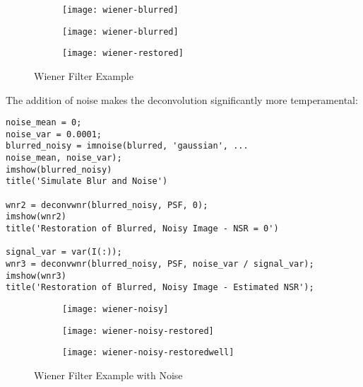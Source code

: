 \begin{figure}[ht]
	\centering
	\begin{subfigure}[b]{0.3\textwidth}
		\centering
		\texttt{[image: wiener-blurred]}
		\caption{}
		\label{fig:wiener-original}
	\end{subfigure}\hfill
	\begin{subfigure}[b]{0.3\textwidth}
		\centering
		\texttt{[image: wiener-blurred]}
		\caption{}
		\label{fig:wiener-blurred}
	\end{subfigure}\hfill
	\begin{subfigure}[b]{0.3\textwidth}
		\centering
		\texttt{[image: wiener-restored]}
		\caption{}
		\label{fig:wiener-restored}
	\end{subfigure}
	\caption{Wiener Filter Example}\label{fig:wiener}
\end{figure}


The addition of noise makes the deconvolution significantly more temperamental:
\begin{lstlisting}
noise_mean = 0;
noise_var = 0.0001;
blurred_noisy = imnoise(blurred, 'gaussian', ...
noise_mean, noise_var);
imshow(blurred_noisy)
title('Simulate Blur and Noise')

wnr2 = deconvwnr(blurred_noisy, PSF, 0);
imshow(wnr2)
title('Restoration of Blurred, Noisy Image - NSR = 0')

signal_var = var(I(:));
wnr3 = deconvwnr(blurred_noisy, PSF, noise_var / signal_var);
imshow(wnr3)
title('Restoration of Blurred, Noisy Image - Estimated NSR');
\end{lstlisting}

\begin{figure}[ht]
	\centering
	\begin{subfigure}[b]{0.3\textwidth}
		\centering
		\texttt{[image: wiener-noisy]}
		\caption{}
		\label{fig:wiener-noisy}
	\end{subfigure}\hfill
	\begin{subfigure}[b]{0.3\textwidth}
		\centering
		\texttt{[image: wiener-noisy-restored]}
		\caption{}
		\label{fig:wiener-noisy-restored}
	\end{subfigure}\hfill
	\begin{subfigure}[b]{0.3\textwidth}
		\centering
		\texttt{[image: wiener-noisy-restoredwell]}
		\caption{}
		\label{fig:wiener-noisy-restoredwell}
	\end{subfigure}
	\caption{Wiener Filter Example with Noise}\label{fig:wienernoisy}
\end{figure}
